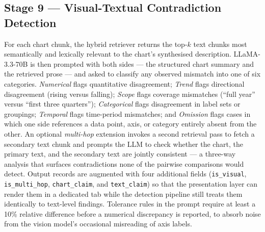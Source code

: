 \documentclass[conference]{IEEEtran}
\begin{document}
\subsection{Stage 9 --- Visual-Textual Contradiction Detection}
For each chart chunk, the hybrid retriever returns the top-$k$ text chunks most semantically and lexically relevant to the chart's synthesised description. LLaMA-3.3-70B is then prompted with both sides --- the structured chart summary and the retrieved prose --- and asked to classify any observed mismatch into one of six categories. \emph{Numerical} flags quantitative disagreement; \emph{Trend} flags directional disagreement (rising versus falling); \emph{Scope} flags coverage mismatches (``full year'' versus ``first three quarters''); \emph{Categorical} flags disagreement in label sets or groupings; \emph{Temporal} flags time-period mismatches; and \emph{Omission} flags cases in which one side references a data point, axis, or category entirely absent from the other. An optional \emph{multi-hop} extension invokes a second retrieval pass to fetch a secondary text chunk and prompts the LLM to check whether the chart, the primary text, and the secondary text are jointly consistent --- a three-way analysis that surfaces contradictions none of the pairwise comparisons would detect.
Output records are augmented with four additional fields (\texttt{is\_visual}, \texttt{is\_multi\_hop}, \texttt{chart\_claim}, and \texttt{text\_claim}) so that the presentation layer can render them in a dedicated tab while the detection pipeline still treats them identically to text-level findings. Tolerance rules in the prompt require at least a 10\% relative difference before a numerical discrepancy is reported, to absorb noise from the vision model's occasional misreading of axis labels.
\end{document}

